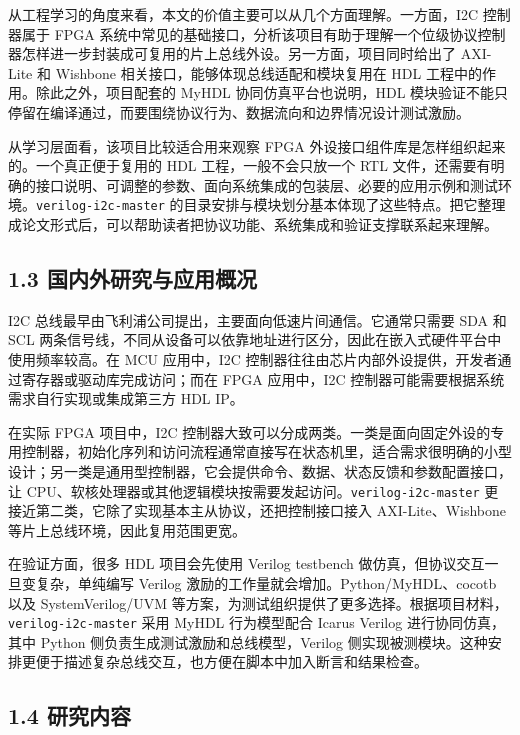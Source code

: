 从工程学习的角度来看，本文的价值主要可以从几个方面理解。一方面，I2C 控制器属于 FPGA 系统中常见的基础接口，分析该项目有助于理解一个位级协议控制器怎样进一步封装成可复用的片上总线外设。另一方面，项目同时给出了 AXI-Lite 和 Wishbone 相关接口，能够体现总线适配和模块复用在 HDL 工程中的作用。除此之外，项目配套的 MyHDL 协同仿真平台也说明，HDL 模块验证不能只停留在编译通过，而要围绕协议行为、数据流向和边界情况设计测试激励。

从学习层面看，该项目比较适合用来观察 FPGA 外设接口组件库是怎样组织起来的。一个真正便于复用的 HDL 工程，一般不会只放一个 RTL 文件，还需要有明确的接口说明、可调整的参数、面向系统集成的包装层、必要的应用示例和测试环境。\texttt{verilog-i2c-master} 的目录安排与模块划分基本体现了这些特点。把它整理成论文形式后，可以帮助读者把协议功能、系统集成和验证支撑联系起来理解。

\subsection{1.3 国内外研究与应用概况}\label{ux56fdux5185ux5916ux7814ux7a76ux4e0eux5e94ux7528ux6982ux51b5}

I2C 总线最早由飞利浦公司提出，主要面向低速片间通信。它通常只需要 SDA 和 SCL 两条信号线，不同从设备可以依靠地址进行区分，因此在嵌入式硬件平台中使用频率较高。在 MCU 应用中，I2C 控制器往往由芯片内部外设提供，开发者通过寄存器或驱动库完成访问；而在 FPGA 应用中，I2C 控制器可能需要根据系统需求自行实现或集成第三方 HDL IP。

在实际 FPGA 项目中，I2C 控制器大致可以分成两类。一类是面向固定外设的专用控制器，初始化序列和访问流程通常直接写在状态机里，适合需求很明确的小型设计；另一类是通用型控制器，它会提供命令、数据、状态反馈和参数配置接口，让 CPU、软核处理器或其他逻辑模块按需要发起访问。\texttt{verilog-i2c-master} 更接近第二类，它除了实现基本主从协议，还把控制接口接入 AXI-Lite、Wishbone 等片上总线环境，因此复用范围更宽。

在验证方面，很多 HDL 项目会先使用 Verilog testbench 做仿真，但协议交互一旦变复杂，单纯编写 Verilog 激励的工作量就会增加。Python/MyHDL、cocotb 以及 SystemVerilog/UVM 等方案，为测试组织提供了更多选择。根据项目材料，\texttt{verilog-i2c-master} 采用 MyHDL 行为模型配合 Icarus Verilog 进行协同仿真，其中 Python 侧负责生成测试激励和总线模型，Verilog 侧实现被测模块。这种安排更便于描述复杂总线交互，也方便在脚本中加入断言和结果检查。

\subsection{1.4 研究内容}\label{ux7814ux7a76ux5185ux5bb9}

